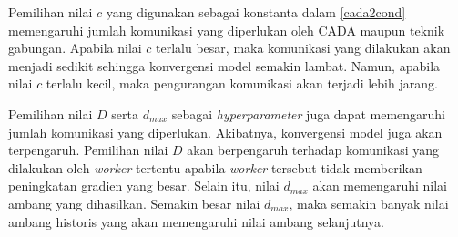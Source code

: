 Pemilihan nilai $c$ yang digunakan sebagai konstanta dalam \autoref{cada2cond} memengaruhi jumlah komunikasi yang diperlukan oleh CADA maupun teknik gabungan. Apabila nilai $c$ terlalu besar, maka komunikasi yang dilakukan akan menjadi sedikit sehingga konvergensi model semakin lambat. Namun, apabila nilai $c$ terlalu kecil, maka pengurangan komunikasi akan terjadi lebih jarang.

Pemilihan nilai $D$ serta $d_{max}$ sebagai \emph{hyperparameter} juga dapat memengaruhi jumlah komunikasi yang diperlukan. Akibatnya, konvergensi model juga akan terpengaruh. Pemilihan nilai $D$ akan berpengaruh terhadap komunikasi yang dilakukan oleh \emph{worker} tertentu apabila \emph{worker} tersebut tidak memberikan peningkatan gradien yang besar. Selain itu, nilai $d_{max}$ akan memengaruhi nilai ambang yang dihasilkan. Semakin besar nilai $d_{max}$, maka semakin banyak nilai ambang historis yang akan memengaruhi nilai ambang selanjutnya.
